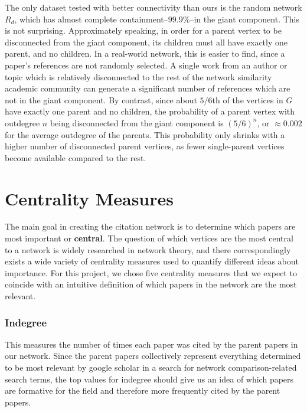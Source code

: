 \documentclass[12pt]{thesis}
\theoremstyle{plain}
\theoremstyle{definition}
\theoremstyle{remark}
\begin{document}
The only dataset tested with better connectivity than ours is the random network $R_d$, which has almost complete containment--$99.9\%$--in the giant component. This is not surprising. Approximately speaking, in order for a parent vertex to be disconnected from the giant component, its children must all have exactly one parent, and no children.  In a real-world network, this is easier to find, since a paper's references are not randomly selected. A single work from an author or topic which is relatively disconnected to the rest of the network similarity academic community can generate a significant number of references which are not in the giant component. By contrast, since about $5/6$th of the vertices in $G$ have exactly one parent and no children, the probability of a parent vertex with outdegree $n$ being disconnected from the giant component is $(5/6)^n$, or $\approx 0.002$ for the average outdegree of the parents. This probability only shrinks with a higher number of disconnected parent vertices, as fewer single-parent vertices become available compared to the rest.








\section{Centrality Measures}

The main goal in creating the citation network is to determine which papers are most important or \textbf{central}. The question of which vertices are the most central to a network is widely researched in network theory, and there correspondingly exists a wide variety of centrality measures used to quantify different ideas about importance. For this project, we chose five centrality measures that we expect to coincide with an intuitive definition of which papers in the network are the most relevant.


\subsubsection{Indegree} This measures the number of times each paper was cited by the parent papers in our network. Since the parent papers collectively represent everything determined to be most relevant by google scholar in a search for network comparison-related search terms, the top values for indegree should give us an idea of which papers are formative for the field and therefore more frequently cited by the parent papers.
\end{document}
